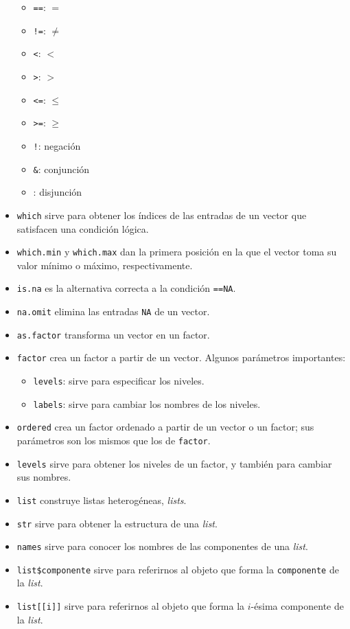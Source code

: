 \documentclass[
]{book}
\providecommand{\tightlist}{%
  \setlength{\itemsep}{0pt}\setlength{\parskip}{0pt}}
\theoremstyle{definition}
\theoremstyle{definition}
\theoremstyle{definition}
\theoremstyle{remark}
\begin{document}
\begin{itemize}
  \begin{itemize}
  \tightlist
  \item
    \texttt{==}: \(=\)
  \item
    \texttt{!=}: \(\neq\)
  \item
    \texttt{\textless{}}: \(<\)
  \item
    \texttt{\textgreater{}}: \(>\)
  \item
    \texttt{\textless{}=}: \(\leqslant\)
  \item
    \texttt{\textgreater{}=}: \(\geqslant\)
  \item
    \texttt{!}: negación
  \item
    \texttt{\&}: conjunción
  \item
    \texttt{\textbar{}}: disjunción
  \end{itemize}
\item
  \texttt{which} sirve para obtener los índices de las entradas de un vector que satisfacen una condición lógica.
\item
  \texttt{which.min} y \texttt{which.max} dan la primera posición en la que el vector toma su valor mínimo o máximo, respectivamente.
\item
  \texttt{is.na} es la alternativa correcta a la condición \texttt{==NA}.
\item
  \texttt{na.omit} elimina las entradas \texttt{NA} de un vector.
\item
  \texttt{as.factor} transforma un vector en un factor.
\item
  \texttt{factor} crea un factor a partir de un vector. Algunos parámetros importantes:

  \begin{itemize}
  \tightlist
  \item
    \texttt{levels}: sirve para especificar los niveles.
  \item
    \texttt{labels}: sirve para cambiar los nombres de los niveles.
  \end{itemize}
\item
  \texttt{ordered} crea un factor ordenado a partir de un vector o un factor; sus parámetros son los mismos que los de \texttt{factor}.
\item
  \texttt{levels} sirve para obtener los niveles de un factor, y también para cambiar sus nombres.
\item
  \texttt{list} construye listas heterogéneas, \emph{lists}.
\item
  \texttt{str} sirve para obtener la estructura de una \emph{list}.
\item
  \texttt{names} sirve para conocer los nombres de las componentes de una \emph{list}.
\item
  \texttt{list\$componente} sirve para referirnos al objeto que forma la \texttt{componente} de la \emph{list}.
\item
  \texttt{list{[}{[}i{]}{]}} sirve para referirnos al objeto que forma la \(i\)-ésima componente de la \emph{list}.
\end{itemize}
\end{document}
